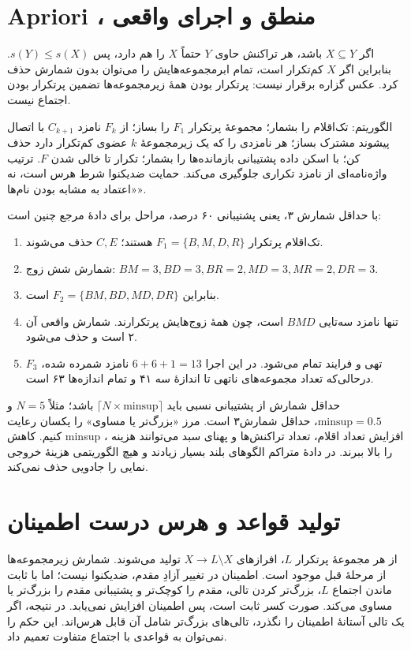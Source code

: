 \documentclass[12pt,a4paper,oneside]{report}
\begin{document}
\section{Apriori ، منطق و اجرای واقعی}

اگر $X\subseteq Y$ باشد، هر تراکنش حاوی $Y$ حتماً $X$ را هم دارد، پس $s(Y)\le s(X)$. بنابراین اگر $X$ کم‌تکرار است، تمام ابرمجموعه‌هایش را می‌توان بدون شمارش حذف کرد. عکس گزاره برقرار نیست: پرتکرار بودن همهٔ زیرمجموعه‌ها تضمین پرتکرار بودن اجتماع نیست.

الگوریتم: تک‌اقلام را بشمار؛ مجموعهٔ پرتکرار $F_1$ را بساز؛ از $F_k$ نامزد $C_{k+1}$ با اتصال پیشوند مشترک بساز؛ هر نامزدی را که یک زیرمجموعهٔ $k$ عضوی کم‌تکرار دارد حذف کن؛ با اسکن داده پشتیبانی بازمانده‌ها را بشمار؛ تکرار تا خالی شدن $F$. ترتیب واژه‌نامه‌ای از نامزد تکراری جلوگیری می‌کند. حمایت ضدیکنوا شرط هرس است، نه «اعتماد به مشابه بودن نام‌ها».

با حداقل شمارش ۳، یعنی پشتیبانی ۶۰ درصد، مراحل برای دادهٔ مرجع چنین است:
\begin{enumerate}
\item تک‌اقلام پرتکرار $F_1=\{B,M,D,R\}$ هستند؛ $C,E$ حذف می‌شوند.
\item شمارش شش زوج: $BM=3,BD=3,BR=2,MD=3,MR=2,DR=3$.
\item بنابراین $F_2=\{BM,BD,MD,DR\}$ است.
\item تنها نامزد سه‌تایی $BMD$ است، چون همهٔ زوج‌هایش پرتکرارند. شمارش واقعی آن ۲ است و حذف می‌شود.
\item $F_3$ تهی و فرایند تمام می‌شود. در این اجرا $6+6+1=13$ نامزد شمرده شده، درحالی‌که تعداد مجموعه‌های ناتهی تا اندازهٔ سه ۴۱ و تمام اندازه‌ها ۶۳ است.
\end{enumerate}

حداقل شمارش از پشتیبانی نسبی باید $\lceil N\times\mathrm{minsup}\rceil$ باشد؛ مثلاً $N=5$ و $\mathrm{minsup}=0.5$، حداقل شمارش۳ است. مرز «بزرگ‌تر یا مساوی» را یکسان رعایت کنیم. کاهش minsup ، افزایش تعداد اقلام، تعداد تراکنش‌ها و پهنای سبد می‌توانند هزینه را بالا ببرند. در دادهٔ متراکم الگوهای بلند بسیار زیادند و هیچ الگوریتمی هزینهٔ خروجی نمایی را جادویی حذف نمی‌کند.

\section{تولید قواعد و هرس درست اطمینان}

از هر مجموعهٔ پرتکرار $L$، افرازهای $X\to L\setminus X$ تولید می‌شوند. شمارش زیرمجموعه‌ها از مرحلهٔ قبل موجود است. اطمینان در تغییر آزادِ مقدم، ضدیکنوا نیست؛ اما با ثابت ماندن اجتماع $L$، بزرگ‌تر کردن تالی، مقدم را کوچک‌تر و پشتیبانی مقدم را بزرگ‌تر یا مساوی می‌کند. صورت کسر ثابت است، پس اطمینان افزایش نمی‌یابد. در نتیجه، اگر یک تالی آستانهٔ اطمینان را نگذرد، تالی‌های بزرگ‌تر شامل آن قابل هرس‌اند. این حکم را نمی‌توان به قواعدی با اجتماع متفاوت تعمیم داد.
\end{document}
